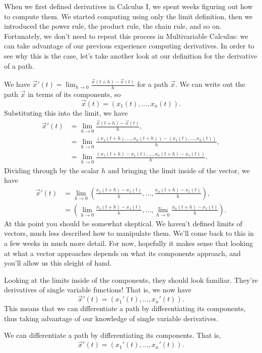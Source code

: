 \documentclass{ximera}
\begin{document}
When we first defined derivatives in Calculus I, we spent weeks figuring out how to compute them. We started computing using only the limit definition, then we introduced the power rule, the product rule, the chain rule, and so on. Fortunately, we don't need to repeat this process in Multivariable Calculus: we can take advantage of our previous experience computing derivatives. In order to see why this is the case, let's take another look at our definition for the derivative of a path.

We have $\vec{x}'(t) = \lim_{h\rightarrow 0} \frac{\vec{x}(t+h) - \vec{x}(t)}{h}$ for a path $\vec{x}$. We can write out the path $\vec{x}$ in terms of its components, so
\[
\vec{x}(t) = (x_1(t),...,x_n(t)).
\]
Substituting this into the limit, we have
\begin{align*}
\vec{x}'(t) &= \lim_{h\rightarrow 0} \frac{\vec{x}(t+h) - \vec{x}(t)}{h},\\
&= \lim_{h\rightarrow 0}\frac{(x_1(t+h),...,x_n(t+h)) - (x_1(t),...,x_n(t))}{h},\\
&= \lim_{h\rightarrow 0}\frac{(x_1(t+h) - x_1(t),...,x_n(t+h) - x_1(t))}{h}.
\end{align*}
Dividing through by the scalar $h$ and bringing the limit inside of the vector, we have 
\begin{align*}
\vec{x}'(t) &= \lim_{h\rightarrow 0}\left(\frac{x_1(t+h) - x_1(t)}{h},...,\frac{x_n(t+h) - x_1(t)}{h}\right),\\
&= \left(\lim_{h\rightarrow 0}\frac{x_1(t+h) - x_1(t)}{h},...,\lim_{h\rightarrow 0}\frac{x_n(t+h) - x_1(t)}{h}\right).
\end{align*}
At this point you should be somewhat skeptical. We haven't defined limits of vectors, much less described how to manipulate them. We'll come back to this in a few weeks in much more detail. For now, hopefully it makes sense that looking at what a vector approaches depends on what its components approach, and you'll allow us this sleight of hand.

Looking at the limits inside of the components, they should look familiar. They're derivatives of single variable functions! That is, we now have 
\[
\vec{x}'(t) = (x_1'(t),...,x_n'(t)).
\]
This means that we can differentiate a path by differentiating its components, thus taking advantage of our knowledge of single variable derivatives.

\begin{proposition}
We can differentiate a path by differentiating its components. That is,
\[
\vec{x}'(t) = (x_1'(t),...,x_n'(t)).
\]
\end{proposition}
\end{document}
